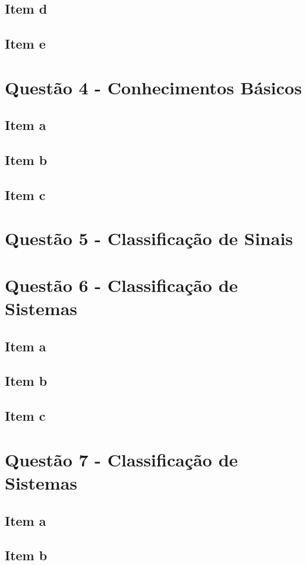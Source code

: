 \documentclass[a4paper, 12pt]{article}
\begin{document}
        \subsection{Item d}
        \subsection{Item e}
    \section{Quest\~{a}o 4 - Conhecimentos Básicos}
        \subsection{Item a}
        \subsection{Item b}
        \subsection{Item c}
    \section{Quest\~{a}o 5 - Classificação de Sinais}
    \section{Quest\~{a}o 6 - Classificação de Sistemas}
        \subsection{Item a}
        \subsection{Item b}
        \subsection{Item c}
    \section{Quest\~{a}o 7 - Classificação de Sistemas}
        \subsection{Item a}
        \subsection{Item b}
\end{document}
